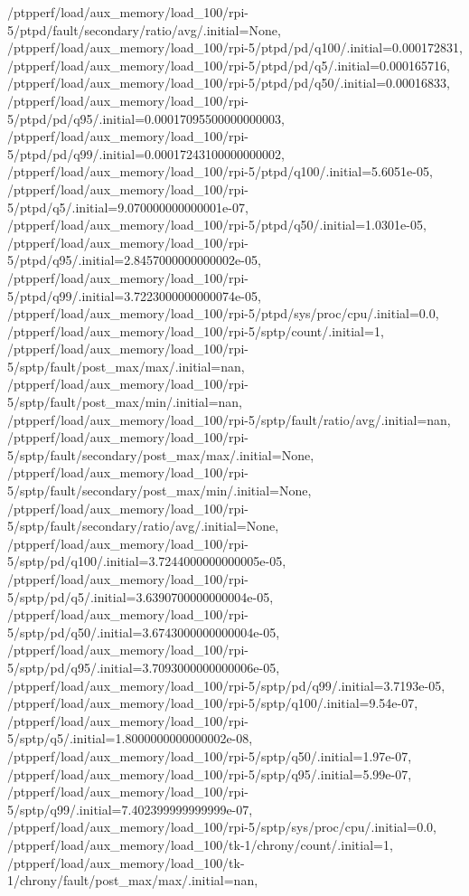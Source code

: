 {    /ptpperf/load/aux_memory/load_100/rpi-5/ptpd/fault/secondary/ratio/avg/.initial=None,
    /ptpperf/load/aux_memory/load_100/rpi-5/ptpd/pd/q100/.initial=0.000172831,
    /ptpperf/load/aux_memory/load_100/rpi-5/ptpd/pd/q5/.initial=0.000165716,
    /ptpperf/load/aux_memory/load_100/rpi-5/ptpd/pd/q50/.initial=0.00016833,
    /ptpperf/load/aux_memory/load_100/rpi-5/ptpd/pd/q95/.initial=0.00017095500000000003,
    /ptpperf/load/aux_memory/load_100/rpi-5/ptpd/pd/q99/.initial=0.00017243100000000002,
    /ptpperf/load/aux_memory/load_100/rpi-5/ptpd/q100/.initial=5.6051e-05,
    /ptpperf/load/aux_memory/load_100/rpi-5/ptpd/q5/.initial=9.070000000000001e-07,
    /ptpperf/load/aux_memory/load_100/rpi-5/ptpd/q50/.initial=1.0301e-05,
    /ptpperf/load/aux_memory/load_100/rpi-5/ptpd/q95/.initial=2.8457000000000002e-05,
    /ptpperf/load/aux_memory/load_100/rpi-5/ptpd/q99/.initial=3.7223000000000074e-05,
    /ptpperf/load/aux_memory/load_100/rpi-5/ptpd/sys/proc/cpu/.initial=0.0,
    /ptpperf/load/aux_memory/load_100/rpi-5/sptp/count/.initial=1,
    /ptpperf/load/aux_memory/load_100/rpi-5/sptp/fault/post_max/max/.initial=nan,
    /ptpperf/load/aux_memory/load_100/rpi-5/sptp/fault/post_max/min/.initial=nan,
    /ptpperf/load/aux_memory/load_100/rpi-5/sptp/fault/ratio/avg/.initial=nan,
    /ptpperf/load/aux_memory/load_100/rpi-5/sptp/fault/secondary/post_max/max/.initial=None,
    /ptpperf/load/aux_memory/load_100/rpi-5/sptp/fault/secondary/post_max/min/.initial=None,
    /ptpperf/load/aux_memory/load_100/rpi-5/sptp/fault/secondary/ratio/avg/.initial=None,
    /ptpperf/load/aux_memory/load_100/rpi-5/sptp/pd/q100/.initial=3.7244000000000005e-05,
    /ptpperf/load/aux_memory/load_100/rpi-5/sptp/pd/q5/.initial=3.6390700000000004e-05,
    /ptpperf/load/aux_memory/load_100/rpi-5/sptp/pd/q50/.initial=3.6743000000000004e-05,
    /ptpperf/load/aux_memory/load_100/rpi-5/sptp/pd/q95/.initial=3.7093000000000006e-05,
    /ptpperf/load/aux_memory/load_100/rpi-5/sptp/pd/q99/.initial=3.7193e-05,
    /ptpperf/load/aux_memory/load_100/rpi-5/sptp/q100/.initial=9.54e-07,
    /ptpperf/load/aux_memory/load_100/rpi-5/sptp/q5/.initial=1.8000000000000002e-08,
    /ptpperf/load/aux_memory/load_100/rpi-5/sptp/q50/.initial=1.97e-07,
    /ptpperf/load/aux_memory/load_100/rpi-5/sptp/q95/.initial=5.99e-07,
    /ptpperf/load/aux_memory/load_100/rpi-5/sptp/q99/.initial=7.402399999999999e-07,
    /ptpperf/load/aux_memory/load_100/rpi-5/sptp/sys/proc/cpu/.initial=0.0,
    /ptpperf/load/aux_memory/load_100/tk-1/chrony/count/.initial=1,
    /ptpperf/load/aux_memory/load_100/tk-1/chrony/fault/post_max/max/.initial=nan,
}
